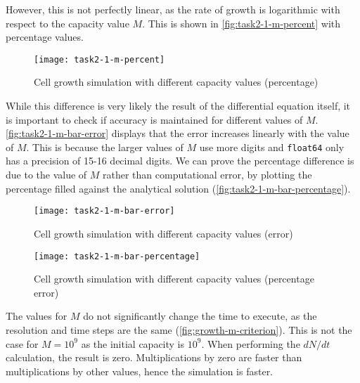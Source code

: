 However, this is not perfectly linear, as the rate of growth is logarithmic with respect to the capacity value $M$.
This is shown in \autoref{fig:task2-1-m-percent} with percentage values.

\begin{figure}[ht]
    \centering
    \texttt{[image: task2-1-m-percent]}
    \caption[Cell growth simulation with different capacity values (percentage)]{Cell growth simulation with different capacity values (percentage)}
    \label{fig:task2-1-m-percent}
\end{figure}

\clearpage





While this difference is very likely the result of the differential equation itself, it is important to check if accuracy is maintained for different values of $M$.
\autoref{fig:task2-1-m-bar-error} displays that the error increases linearly with the value of $M$.
This is because the larger values of $M$ use more digits and \verb|float64| only has a precision of 15-16 decimal digits.
We can prove the percentage difference is due to the value of $M$ rather than computational error,
by plotting the percentage filled against the analytical solution (\autoref{fig:task2-1-m-bar-percentage}).

\begin{figure}[ht]
    \centering
    \texttt{[image: task2-1-m-bar-error]}
    \caption[Cell growth simulation with different capacity values (error)]{Cell growth simulation with different capacity values (error) }
    \label{fig:task2-1-m-bar-error}
\end{figure}

\begin{figure}[ht]
    \centering
    \texttt{[image: task2-1-m-bar-percentage]}
    \caption[Cell growth simulation with different capacity values (percentage error)]{Cell growth simulation with different capacity values (percentage error) }
    \label{fig:task2-1-m-bar-percentage}
\end{figure}

The values for $M$ do not significantly change the time to execute, as the resolution and time steps are the same (\autoref{fig:growth-m-criterion}).
This is not the case for $M=10^9$ as the initial capacity is $10^9$.
When performing the $dN/dt$ calculation, the result is zero.
Multiplications by zero are faster than multiplications by other values, hence the simulation is faster.


